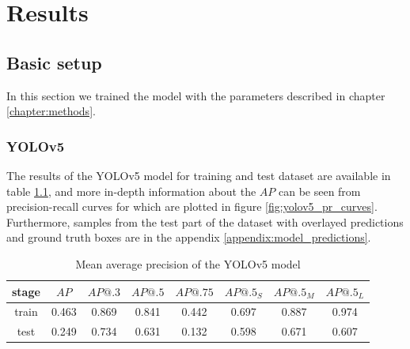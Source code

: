 \chapter{Results}
\label{chapter:results}

\section{Basic setup}
In this section we trained the model with the parameters described in chapter \ref{chapter:methods}.
\subsection{YOLOv5}
The results of the YOLOv5 model for training and test dataset are available in table \ref{tab:yolov5_basic}, and more in-depth information about the $AP$ can be seen from precision-recall curves for which are plotted in figure \ref{fig:yolov5_pr_curves}. Furthermore, samples from the test part of the dataset with overlayed predictions and ground truth boxes are in the appendix \ref{appendix:model_predictions}.
\begin{table}
    \begin{tabular}{c|c|c|c|c|c|c|c}
        stage & $AP$  & $AP@.3$ & $AP@.5$ & $AP@.75$ & $AP@.5_S$ & $AP@.5_M$ & $AP@.5_L$ \\ \hline
        train & 0.463 & 0.869   & 0.841   & 0.442    & 0.697     & 0.887     & 0.974     \\ \hline
        test  & 0.249 & 0.734   & 0.631   & 0.132    & 0.598     & 0.671     & 0.607     \\
    \end{tabular}
    \caption{Mean average precision of the YOLOv5 model}
    \label{tab:yolov5_basic}
\end{table}

